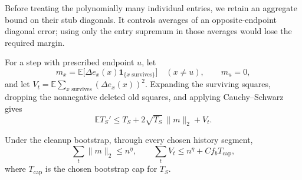 Before treating the polynomially many individual entries, we retain an
aggregate bound on their stub diagonals.  It controls averages of an
opposite-endpoint diagonal error; using only the entry supremum in those
averages would lose the required margin.

For a step with prescribed endpoint $u$, let
\[
 m_x=\mathbb E\bigl[\Delta e_x(x)
                   \mathbf1_{\{x\text{ survives}\}}\bigr]
 \quad(x\ne u),\qquad m_u=0,
\]
and let
$V_t=\mathbb E\sum_{x\text{ survives}}(\Delta e_x(x))^2$.
Expanding the surviving squares, dropping the nonnegative deleted
old squares, and applying Cauchy--Schwarz gives
\begin{equation}
 \mathbb ET_S'\leq T_S+2\sqrt{T_S}\,\|m\|_2+V_t.
\label{eq:original-37}
\end{equation}

\begin{lemma}
\label{lem:cleanup-diagonal}
Under the cleanup bootstrap, through every chosen history segment,
\[
 \sum_t\|m\|_2\leq n^\eta,\qquad
 \sum_tV_t\leq n^\eta+Cf_bT_{\mathrm{cap}},
\]
where $T_{\mathrm{cap}}$ is the chosen bootstrap cap for $T_S$.
\end{lemma}

